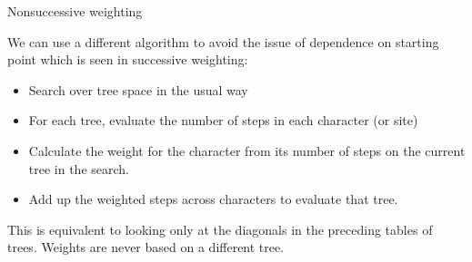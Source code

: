 \documentclass[bluish,slideColor,colorBG,pdf]{prosper}
\begin{document}
\begin{slide}[Replace]{Nonsuccessive weighting}
\bigskip

We can use a different algorithm to avoid the issue of dependence
on starting point which is seen in successive weighting:
\medskip

\begin{itemize}
\item Search over tree space in the usual way
\item For each tree, evaluate the number of steps in each character (or site)
\item Calculate the weight for the character from its number of steps on the
current tree in the search.
\item Add up the weighted steps across characters to evaluate that tree.
\end{itemize}
\bigskip

This is equivalent to looking only at the diagonals in the preceding tables
of trees.  Weights are never based on a different tree.

\end{slide}
\end{document}

